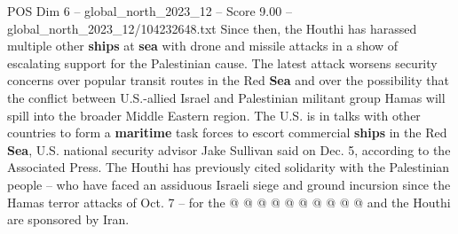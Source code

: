 \begin{textsample}{POS Dim 6 – global\_north\_2023\_12 – Score 9.00 – global\_north\_2023\_12/104232648.txt}
Since then, the Houthi has harassed multiple other \textbf{ships} at \textbf{sea} with drone and missile attacks in a show of escalating support for the Palestinian cause.
The latest attack worsens security concerns over popular transit routes in the Red \textbf{Sea} and over the possibility that the conflict between U.S.-allied Israel and Palestinian militant group Hamas will spill into the broader Middle Eastern region.
The U.S. is in talks with other countries to form a \textbf{maritime} task forces to escort commercial \textbf{ships} in the Red \textbf{Sea}, U.S. national security advisor Jake Sullivan said on Dec. 5, according to the Associated Press.
The Houthi has previously cited solidarity with the Palestinian people -- who have faced an assiduous Israeli siege and ground incursion since the Hamas terror attacks of Oct. 7 -- for the @ @ @ @ @ @ @ @ @ @ and the Houthi are sponsored by Iran.

\end{textsample}
